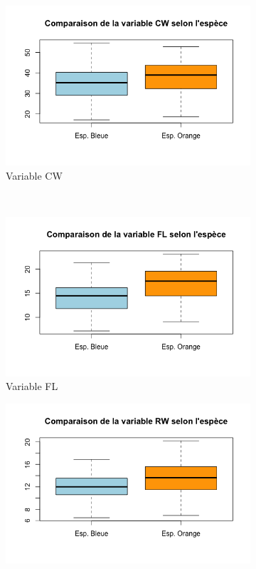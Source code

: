 \documentclass[a4paper,11pt]{report}
\begin{document}
\begin{figure}[H]
\begin{subfigure}[b]{0.3\linewidth}
		\includegraphics[width=1\linewidth]{img/1-2-1-espece-cw.png}
		\caption{\scriptsize Variable CW}
		\label{fig:1_2_1_espece_cw}
	\end{subfigure}%
	\\
	\begin{subfigure}[b]{0.3\linewidth}
		\centering
		\captionsetup{justification=centering, margin=1cm}
		\includegraphics[width=1\linewidth]{img/1-2-1-espece-fl.png}
		\caption{\scriptsize Variable FL}
		\label{fig:1_2_1_espece_fl}
	\end{subfigure}%
	\begin{subfigure}[b]{0.3\linewidth}
		\centering
		\captionsetup{justification=centering, margin=1cm}
		\includegraphics[width=1\linewidth]{img/1-2-1-espece-rw.png}

\end{subfigure}
\end{figure}
\end{document}
